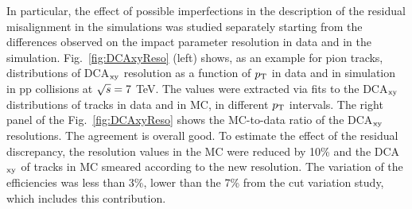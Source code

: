 In particular, the effect of possible imperfections in the description 
of the residual misalignment in the simulations was studied separately 
starting from the differences observed on the impact parameter resolution
in data and in the simulation.
Fig.~\ref{fig:DCAxyReso} (left) shows, as an example for pion tracks, distributions of
DCA$_{\rm xy}$ resolution as a function of $p_{\rm T}$ in data and in simulation 
in pp collisions at $\sqrt{s} = 7 $ TeV. The values were extracted via fits to the DCA$_{\rm xy}$ distributions
of tracks in data and in MC, in different $p_{\rm T}$ intervals. 
The right panel of the Fig.~\ref{fig:DCAxyReso} shows the 
MC-to-data ratio of the DCA$_{\rm xy}$ resolutions. 
The agreement is overall good. To estimate the effect of the residual discrepancy,
the resolution values in the MC were reduced by 10\% and the
DCA$_{\rm xy}$ of tracks in MC smeared according to the new resolution.
The variation of the efficiencies was less than 3\%, lower
than the 7\% from the cut variation study, which includes this contribution.

